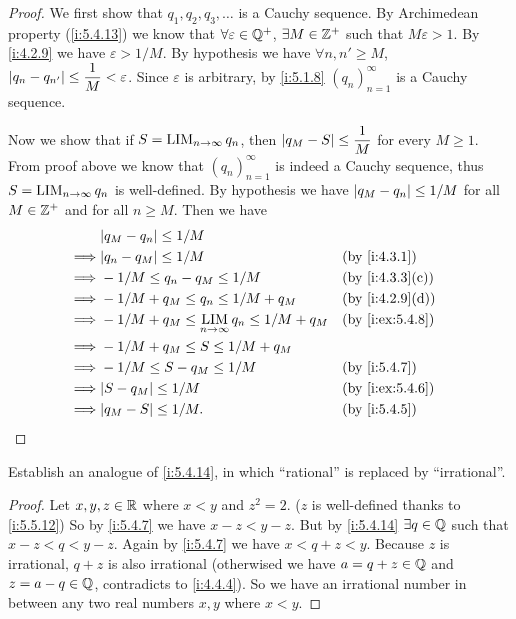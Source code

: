 \begin{proof}
  We first show that \(q_1, q_2, q_3, \dots\) is a Cauchy sequence.
  By Archimedean property (\cref{i:5.4.13}) we know that \(\forall \varepsilon \in \mathbb{Q}^+\), \(\exists M \in \mathbb{Z}^+\) such that \(M\varepsilon > 1\).
  By \cref{i:4.2.9} we have \(\varepsilon > 1 / M\).
  By hypothesis we have \(\forall n, n' \geq M\), \(\left\lvert q_n - q_{n'}\right\rvert \leq \dfrac{1}{M} < \varepsilon\).
  Since \(\varepsilon\) is arbitrary, by \cref{i:5.1.8} \((q_n)_{n = 1}^{\infty}\) is a Cauchy sequence.

  Now we show that if \(S = \operatorname*{LIM}_{n \to \infty} q_n\), then \(\left\lvert q_M - S\right\rvert \leq \dfrac{1}{M}\) for every \(M \geq 1\).
  From proof above we know that \((q_n)_{n = 1}^\infty\) is indeed a Cauchy sequence, thus \(S = \operatorname*{LIM}_{n \to \infty} q_n\) is well-defined.
  By hypothesis we have \(\left\lvert q_M - q_n\right\rvert \leq 1 / M\) for all \(M \in \mathbb{Z}^+\) and for all \(n \geq M\).
  Then we have
  \begin{align*}
             & \abs{q_M - q_n} \leq 1 / M                                                      \\
    \implies & \abs{q_n - q_M} \leq 1 / M                                 &  & \by{i:4.3.1}    \\
    \implies & -1 / M \leq q_n - q_M \leq 1 / M                           &  & \by{i:4.3.3}[c] \\
    \implies & -1 / M + q_M \leq q_n \leq 1 / M + q_M                     &  & \by{i:4.2.9}[d] \\
    \implies & -1 / M + q_M \leq \LIM_{n \to \infty} q_n \leq 1 / M + q_M &  & \by{i:ex:5.4.8} \\
    \implies & -1 / M + q_M \leq S \leq 1 / M + q_M                                            \\
    \implies & -1 / M \leq S - q_M \leq 1 / M                             &  & \by{i:5.4.7}    \\
    \implies & \abs{S - q_M} \leq 1 / M                                   &  & \by{i:ex:5.4.6} \\
    \implies & \abs{q_M - S} \leq 1 / M.                                  &  & \by{i:5.4.5}
  \end{align*}
\end{proof}

\begin{ex}\label{i:ex:5.5.5}
  Establish an analogue of \cref{i:5.4.14}, in which ``rational'' is replaced by ``irrational''.
\end{ex}

\begin{proof}
  Let \(x, y, z \in \mathbb{R}\) where \(x < y\) and \(z^2 = 2\).
  (\(z\) is well-defined thanks to \cref{i:5.5.12})
  So by \cref{i:5.4.7} we have \(x - z < y - z\).
  But by \cref{i:5.4.14} \(\exists q \in \mathbb{Q}\) such that \(x - z < q < y - z\).
  Again by \cref{i:5.4.7} we have \(x < q + z < y\).
  Because \(z\) is irrational, \(q + z\) is also irrational
  (otherwised we have \(a = q + z \in \mathbb{Q}\) and \(z = a - q \in \mathbb{Q}\), contradicts to \cref{i:4.4.4}).
  So we have an irrational number in between any two real numbers \(x, y\) where \(x < y\).
\end{proof}
